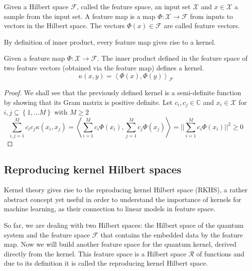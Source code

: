 \begin{definicion}
    Given a Hilbert space $\mathcal{F}$, called the feature space, an input set $\mathcal{X}$ and $x \in \mathcal{X}$ a sample from the input set. A feature map is a map $\Phi : \mathcal{X \longrightarrow \mathcal{F}}$ from inputs to vectors in the Hilbert space. The vectors $\Phi(x) \in \mathcal{F}$ are called feature vectors.      
\end{definicion}

By definition of inner product, every feature map gives rise to a kernel.

\begin{teorema}\label{th:feature map->kernel}
    Given a feature map $\Phi: \mathcal{X} \longrightarrow \mathcal{F}$. The inner product defined in the feature space of two feature vectors (obtained via the feature map) defines a kernel. 
    $$\kappa(x,y)=\left< \Phi(x), \Phi(y) \right>_{\mathcal{F}}$$
\end{teorema}
\begin{proof}
    We shall see that the previously defined kernel is a semi-definite function by showing that its Gram matrix is positive definite. 
    Let $c_i,c_j \in \mathbb{C}$ and $x_i \in \mathcal{X}$ for $i,j \subseteq \left\lbrace1,...M\right\rbrace$ with $M \geq 2$
    \begin{equation*}
        \sum_{i,j=1}^M c_i c_j \kappa(x_i,x_j) = \left< \sum_{i=1}^M c_i \Phi(x_i) , \sum_{j=1}^M c_j \Phi(x_j) \right> = ||\sum_{i=1}^M c_i \Phi(x_i) ||^2 \geq 0 
    \end{equation*}
\end{proof}


\subsection{Reproducing kernel Hilbert spaces}
Kernel theory gives rise to the reproducing kernel Hilbert space (RKHS), a rather abstract concept yet useful in order to understand the importance of kernels for machine learning, as their connection to linear models in feature space. 

So far, we are dealing with two Hilbert spaces: the Hilbert space of the quantum system and the feature space $\mathcal{F}$ that contains the embedded data by the feature map. Now we will build another feature space for the quantum kernel, derived directly from the kernel. This feature space is a Hilbert space $\mathcal{R}$ of functions and due to its definition it is called the reproducing kernel Hilbert space.

